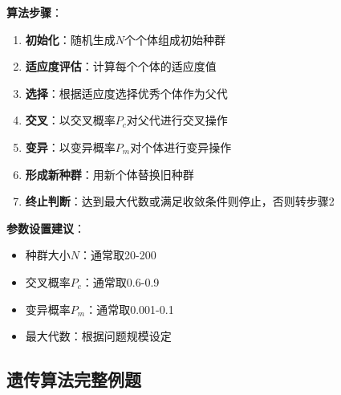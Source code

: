 \textbf{算法步骤}：
\begin{enumerate}[leftmargin=2em,itemsep=0pt]
    \item \textbf{初始化}：随机生成$N$个个体组成初始种群
    \item \textbf{适应度评估}：计算每个个体的适应度值
    \item \textbf{选择}：根据适应度选择优秀个体作为父代
    \item \textbf{交叉}：以交叉概率$P_c$对父代进行交叉操作
    \item \textbf{变异}：以变异概率$P_m$对个体进行变异操作
    \item \textbf{形成新种群}：用新个体替换旧种群
    \item \textbf{终止判断}：达到最大代数或满足收敛条件则停止，否则转步骤2
\end{enumerate}

\begin{notebox}
\textbf{参数设置建议}：
\begin{itemize}[itemsep=0pt]
    \item 种群大小$N$：通常取20-200
    \item 交叉概率$P_c$：通常取0.6-0.9
    \item 变异概率$P_m$：通常取0.001-0.1
    \item 最大代数：根据问题规模设定
\end{itemize}
\end{notebox}

\subsection{遗传算法完整例题}

